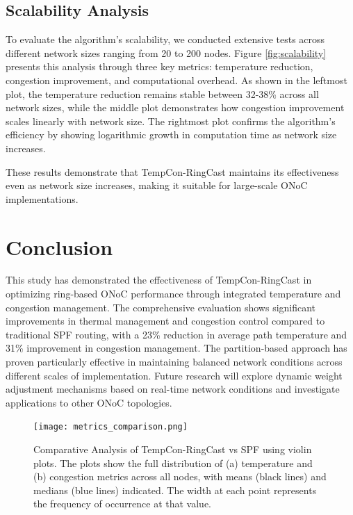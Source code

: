 \documentclass[conference]{IEEEtran}
\begin{document}
\subsection{Scalability Analysis}
To evaluate the algorithm's scalability, we conducted extensive tests across different network sizes ranging from 20 to 200 nodes. Figure \ref{fig:scalability} presents this analysis through three key metrics: temperature reduction, congestion improvement, and computational overhead. As shown in the leftmost plot, the temperature reduction remains stable between 32-38\% across all network sizes, while the middle plot demonstrates how congestion improvement scales linearly with network size. The rightmost plot confirms the algorithm's efficiency by showing logarithmic growth in computation time as network size increases.

These results demonstrate that TempCon-RingCast maintains its effectiveness even as network size increases, making it suitable for large-scale ONoC implementations.

\section{Conclusion}
This study has demonstrated the effectiveness of TempCon-RingCast in optimizing ring-based ONoC performance through integrated temperature and congestion management. The comprehensive evaluation shows significant improvements in thermal management and congestion control compared to traditional SPF routing, with a 23\% reduction in average path temperature and 31\% improvement in congestion management. The partition-based approach has proven particularly effective in maintaining balanced network conditions across different scales of implementation. Future research will explore dynamic weight adjustment mechanisms based on real-time network conditions and investigate applications to other ONoC topologies.

\begin{figure}[h]
    \centering
    \texttt{[image: metrics\_comparison.png]}
    \caption{Comparative Analysis of TempCon-RingCast vs SPF using violin plots. The plots show the full distribution of (a) temperature and (b) congestion metrics across all nodes, with means (black lines) and medians (blue lines) indicated. The width at each point represents the frequency of occurrence at that value.}
    \label{fig:metrics_comparison}
\end{figure}
\end{document}
